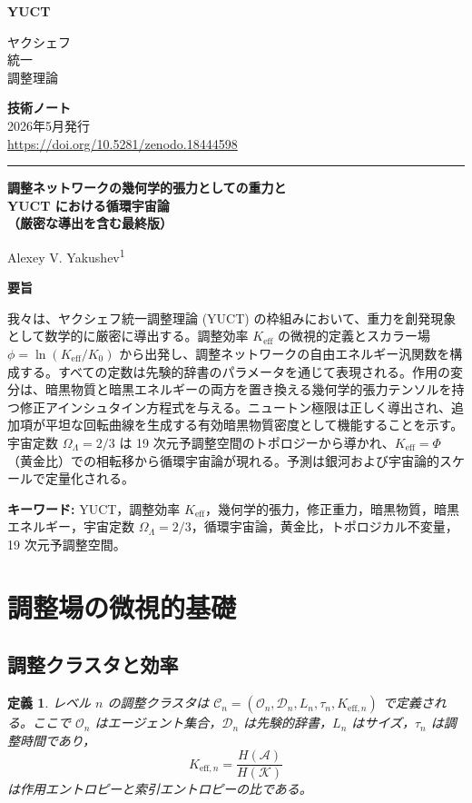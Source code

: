 \documentclass[12pt,a4paper]{article}
\newtheorem{definition}[theorem]{定義}
\newcommand{\Dir}{\mathcal{D}}
\newcommand{\makeheader}{%
	\noindent
	\begin{minipage}{0.17\textwidth}
		\raggedright
		{\sffamily\bfseries\color{skyblue}\fontsize{46}{46}\selectfont YUCT}%
	\end{minipage}%
	\hspace{30pt}
	\begin{minipage}{0.32\textwidth}
		\raggedright
		{\sffamily\fontsize{11}{13}\selectfont ヤクシェフ\\ 統一\\ 調整理論}%
	\end{minipage}%
	\hfill
	\begin{minipage}{0.38\textwidth}
		\raggedleft
		{\sffamily\bfseries 技術ノート}\\ 
		{\sffamily 2026年5月発行}\\ 
		{\sffamily\footnotesize \scriptsize\url{https://doi.org/10.5281/zenodo.18444598}}%
	\end{minipage}
	\par\vspace{5pt}
	\noindent\textcolor{gold}{\rule{\textwidth}{1.6pt}}
	\par\vspace{0pt}
}
\begin{document}
	\thispagestyle{firstpage}
	\makeheader
	
	\vspace{0cm}
	{\LARGE\bfseries 調整ネットワークの幾何学的張力としての重力と\\
		YUCT における循環宇宙論 \\
		（厳密な導出を含む最終版）\par}
	\vspace{0.2cm}
	
	{\large Alexey V. Yakushev\textsuperscript{1}} \\
	\vspace{0.0cm}
	
	{\color{darkblue}\textbf{\LARGE 要旨}} \par
	{\large
		\noindent
		我々は、ヤクシェフ統一調整理論 (YUCT) の枠組みにおいて、重力を創発現象として数学的に厳密に導出する。調整効率 \(K_{\mathrm{eff}}\) の微視的定義とスカラー場 \(\phi = \ln (K_{\mathrm{eff}}/K_0)\) から出発し、調整ネットワークの自由エネルギー汎関数を構成する。すべての定数は先験的辞書のパラメータを通じて表現される。作用の変分は、暗黒物質と暗黒エネルギーの両方を置き換える幾何学的張力テンソルを持つ修正アインシュタイン方程式を与える。ニュートン極限は正しく導出され、追加項が平坦な回転曲線を生成する有効暗黒物質密度として機能することを示す。宇宙定数 \(\Omega_\Lambda = 2/3\) は 19 次元予調整空間のトポロジーから導かれ、\(K_{\mathrm{eff}} = \Phi\)（黄金比）での相転移から循環宇宙論が現れる。予測は銀河および宇宙論的スケールで定量化される。}
	
	\vspace{0.1cm}
	\noindent
	{\color{darkblue}\textbf{キーワード:}} YUCT，調整効率 \(K_{\mathrm{eff}}\)，幾何学的張力，修正重力，暗黒物質，暗黒エネルギー，宇宙定数 \(\Omega_\Lambda=2/3\)，循環宇宙論，黄金比，トポロジカル不変量，19 次元予調整空間。
	
	\vspace{0.4cm}
	
	\tableofcontents
	
	\section{調整場の微視的基礎}
	
	\subsection{調整クラスタと効率}
	\begin{definition}
		レベル \(n\) の調整クラスタは \(\mathcal{C}_n = (\mathcal{O}_n, \Dir_n, L_n, \tau_n, K_{\mathrm{eff},n})\) で定義される。ここで \(\mathcal{O}_n\) はエージェント集合，\(\Dir_n\) は先験的辞書，\(L_n\) はサイズ，\(\tau_n\) は調整時間であり，
		\[
		K_{\mathrm{eff},n} = \frac{H(\mathcal{A})}{H(\mathcal{K})}
		\]
		は作用エントロピーと索引エントロピーの比である。
	\end{definition}
	
\end{document}
